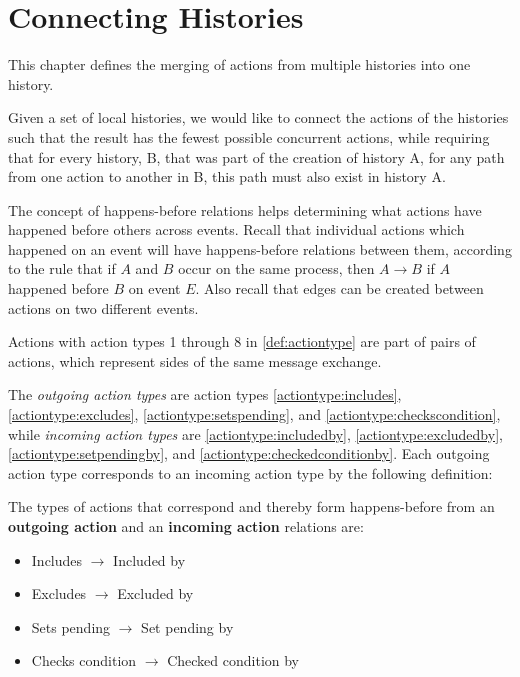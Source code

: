 \chapter{Connecting Histories} 
\label{chap:connecting-histories}
	This chapter defines the merging of actions from multiple histories into one history.
	
    \newpar
    Given a set of local histories, we would like to connect the actions of the histories such that the result has the fewest possible concurrent actions, while requiring that for every history, B, that was part of the creation of history A, for any path from one action to another in B, this path must also exist in history A.
    
    \newpar
    The concept of happens-before relations helps determining what actions have happened before others across events. Recall that individual actions which happened on an event will have happens-before relations between them, according to the rule that if $A$ and $B$ occur on the same process, then $A \rightarrow B$ if $A$ happened before $B$ on event $E$.
	Also recall that edges can be created between actions on two different events.
	
    \newpar
	Actions with action types 1 through 8 in \autoref{def:actiontype} are part of pairs of actions, which represent sides of the same message exchange.
	
	The \textit{outgoing action types} are action types \ref{actiontype:includes}, \ref{actiontype:excludes}, \ref{actiontype:setspending}, and \ref{actiontype:checkscondition}, while \textit{incoming action types} are \ref{actiontype:includedby}, \ref{actiontype:excludedby}, \ref{actiontype:setpendingby}, and \ref{actiontype:checkedconditionby}. Each outgoing action type corresponds to an incoming action type by the following definition:
	
	\begin{definition}
		\label{def:happensbeforeaction}
		The types of actions that correspond and thereby form happens-before from an \textbf{outgoing action} and an \textbf{incoming action} relations are:
			\begin{itemize}
				\item Includes $\rightarrow$ Included by
				\item Excludes $\rightarrow$ Excluded by
				\item Sets pending $\rightarrow$ Set pending by
				\item Checks condition $\rightarrow$ Checked condition by
			\end{itemize}
	\end{definition}
	
